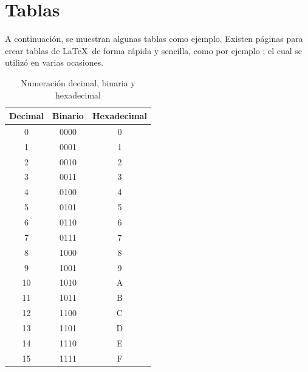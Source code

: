 \clearpage
\section{Tablas}

A continuación, se muestran algunas tablas como ejemplo. Existen páginas para crear tablas de \LaTeX~de forma rápida y sencilla, como por ejemplo \cite{tablas_latex_online}; el cual se utilizó en varias ocasiones.


\begin{table}[ht!]
\caption{Numeración decimal, binaria y hexadecimal}
\label{T:dec_bin_hex}
\begin{tabular}{|c|c|c|}
\hline
Decimal & Binario & Hexadecimal \\ \hline \hline
0       & 0000    & 0           \\ \hline
1       & 0001    & 1           \\ \hline
2       & 0010    & 2           \\ \hline
3       & 0011    & 3           \\ \hline
4       & 0100    & 4           \\ \hline
5       & 0101    & 5           \\ \hline
6       & 0110    & 6           \\ \hline
7       & 0111    & 7           \\ \hline
8       & 1000    & 8           \\ \hline
9       & 1001    & 9           \\ \hline
10      & 1010    & A           \\ \hline
11      & 1011    & B           \\ \hline
12      & 1100    & C           \\ \hline
13      & 1101    & D           \\ \hline
14      & 1110    & E           \\ \hline
15      & 1111    & F           \\ \hline
\end{tabular}
\end{table}



